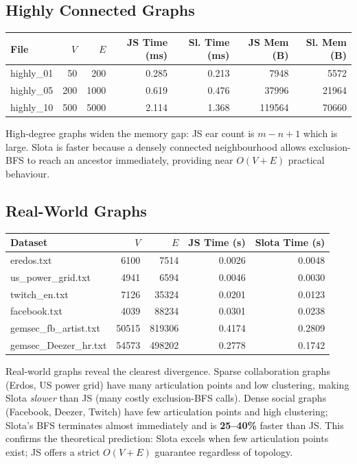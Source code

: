 \documentclass[12pt,a4paper]{article}
\begin{document}
\subsection{Highly Connected Graphs}

\begin{center}
\begin{tabular}{|l|r|r|r|r|r|r|}
\hline
File & $V$ & $E$ & JS Time (ms) & Sl. Time (ms) & JS Mem (B) & Sl. Mem (B) \\ \hline
highly\_01 &  50 &  200 & 0.285 & 0.213 &   7948 &  5572 \\ \hline
highly\_05 & 200 & 1000 & 0.619 & 0.476 &  37996 & 21964 \\ \hline
highly\_10 & 500 & 5000 & 2.114 & 1.368 & 119564 & 70660 \\ \hline
\end{tabular}
\end{center}

High-degree graphs widen the memory gap: JS ear count is $m - n + 1$
which is large.  Slota is faster because a densely connected neighbourhood
allows exclusion-BFS to reach an ancestor immediately, providing near
$O(V+E)$ practical behaviour.

\subsection{Real-World Graphs}

\begin{center}
\begin{tabular}{|l|r|r|r|r|}
\hline
Dataset & $V$ & $E$ & JS Time (s) & Slota Time (s) \\ \hline
eredos.txt               &  6100 &   7514 & 0.0026 & 0.0048 \\ \hline
us\_power\_grid.txt      &  4941 &   6594 & 0.0046 & 0.0030 \\ \hline
twitch\_en.txt           &  7126 &  35324 & 0.0201 & 0.0123 \\ \hline
facebook.txt             &  4039 &  88234 & 0.0301 & 0.0238 \\ \hline
gemsec\_fb\_artist.txt   & 50515 & 819306 & 0.4174 & 0.2809 \\ \hline
gemsec\_Deezer\_hr.txt   & 54573 & 498202 & 0.2778 & 0.1742 \\ \hline
\end{tabular}
\end{center}

Real-world graphs reveal the clearest divergence.  Sparse collaboration
graphs (Erdos, US power grid) have many articulation points and low
clustering, making Slota \emph{slower} than JS (many costly exclusion-BFS
calls).  Dense social graphs (Facebook, Deezer, Twitch) have few
articulation points and high clustering; Slota's BFS terminates almost
immediately and is \textbf{25--40\%} faster than JS.  This confirms the
theoretical prediction: Slota excels when few articulation points exist;
JS offers a strict $O(V+E)$ guarantee regardless of topology.
\end{document}
